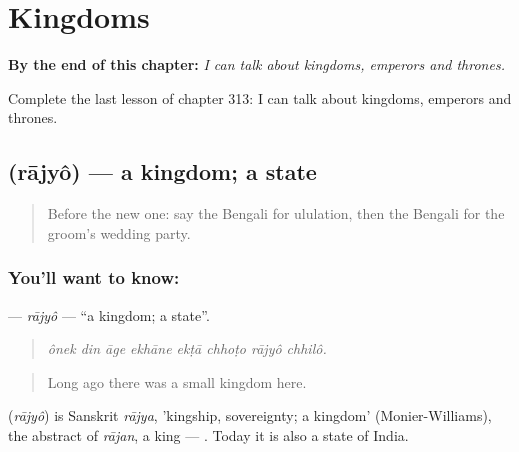 
\chapter{Kingdoms}
\label{ch:bn-kingdoms}

\begin{chapteropening}
\textbf{By the end of this chapter:} \emph{I can talk about kingdoms, emperors and thrones.}

Complete the last lesson of chapter 313: I can talk about kingdoms, emperors and thrones.
\end{chapteropening}

\section[\texorpdfstring{\bn{রাজ্য} (rājyô)}{রাজ্য (rājyô)}]{ (rājyô) — a kingdom; a state}

\label{lesson:BN-C313-rajyo}



\begin{quote}
Before the new one: say the Bengali for ululation, then the Bengali for the groom's wedding party.
\end{quote}

\subsection*{You'll want to know: }
\textbf{} — \emph{rājyô} — \textquotedblleft{}a kingdom; a state\textquotedblright{}.

\begin{quote}
       
\end{quote}

\begin{quote}
\emph{ônek din āge ekhāne ekṭā chhoṭo rājyô chhilô.}
\end{quote}

\begin{quote}
Long ago there was a small kingdom here.
\end{quote}

\begin{cousinweb}
\textbf{} (\emph{rājyô}) is Sanskrit \emph{rājya}, 'kingship, sovereignty; a kingdom' (Monier-Williams), the abstract of \emph{rājan}, a king — \textbf{}. Today it is also a state of India.
\end{cousinweb}


